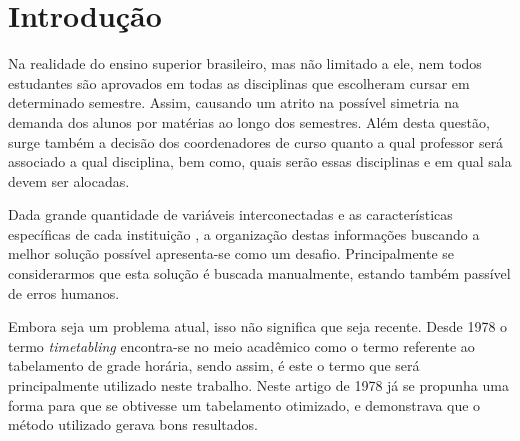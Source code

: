 
\chapter[Introdução]{Introdução}


Na realidade do ensino superior brasileiro, mas não limitado a ele, nem todos estudantes são aprovados em todas as disciplinas que escolheram cursar em determinado semestre. Assim, causando um atrito na possível simetria na demanda dos alunos por matérias ao longo dos semestres. Além desta questão, surge também a decisão dos coordenadores de curso quanto a qual professor será associado a qual disciplina, bem como, quais serão essas disciplinas e em qual sala devem ser alocadas.

Dada grande quantidade de variáveis interconectadas e as características específicas de cada instituição \cite{MIRANDA2012505}, a organização destas informações buscando a melhor solução possível apresenta-se como um desafio. Principalmente se considerarmos que esta solução é buscada manualmente, estando também passível de erros humanos.

Embora seja um problema atual, isso não significa que seja recente. Desde 1978 \cite{BARHAM1978} o termo \textit{timetabling} encontra-se no meio acadêmico como o termo referente ao tabelamento de grade horária, sendo assim, é este o termo que será principalmente utilizado neste trabalho. Neste artigo de 1978 já se propunha uma forma para que se obtivesse um tabelamento otimizado, e demonstrava que o método utilizado gerava bons resultados.